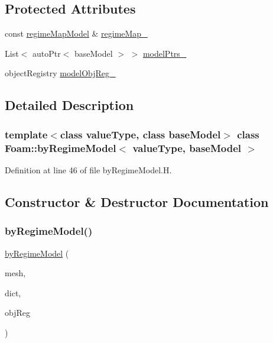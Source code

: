 \subsection*{Protected Attributes}
\begin{DoxyCompactItemize}
\item 
const \hyperlink{classFoam_1_1regimeMapModel}{regime\+Map\+Model} \& \hyperlink{classFoam_1_1byRegimeModel_a152d34753eaaab1a36fc611e622ecb56}{regime\+Map\+\_\+}
\item 
List$<$ auto\+Ptr$<$ base\+Model $>$ $>$ \hyperlink{classFoam_1_1byRegimeModel_a01e57780b33c2287a28b5586a4d8b435}{model\+Ptrs\+\_\+}
\item 
object\+Registry \hyperlink{classFoam_1_1byRegimeModel_a21597c83dba846c0d71f921be0f06d1f}{model\+Obj\+Reg\+\_\+}
\end{DoxyCompactItemize}


\subsection{Detailed Description}
\subsubsection*{template$<$class value\+Type, class base\+Model$>$\newline
class Foam\+::by\+Regime\+Model$<$ value\+Type, base\+Model $>$}



Definition at line 46 of file by\+Regime\+Model.\+H.



\subsection{Constructor \& Destructor Documentation}
\mbox{\label{classFoam_1_1byRegimeModel_aa3971ef6329112501da406b6431087b5}} 
\subsubsection{\texorpdfstring{by\+Regime\+Model()}{byRegimeModel()}\hspace{0.1cm}{\footnotesize\ttfamily [1/2]}}
{\footnotesize\ttfamily \hyperlink{classFoam_1_1byRegimeModel}{by\+Regime\+Model} (\begin{DoxyParamCaption}\item[{const fv\+Mesh \&}]{mesh,  }\item[{const dictionary \&}]{dict,  }\item[{const object\+Registry \&}]{obj\+Reg }\end{DoxyParamCaption})}



